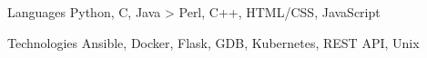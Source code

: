 

\begin{cvskills}

  \cvskill
    {Languages} %
    {Python, C, Java > Perl, C++, HTML/CSS, JavaScript} %

  \cvskill
    {Technologies} %
    {Ansible, Docker, Flask, GDB, Kubernetes, REST API, Unix} %

\end{cvskills}
